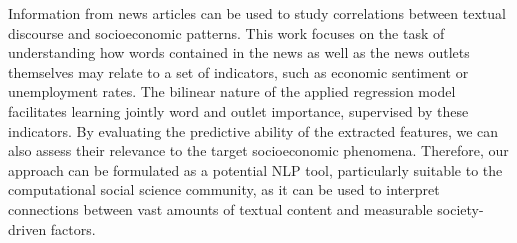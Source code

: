 Information from news articles can be used to study correlations between textual discourse and socioeconomic patterns. This work focuses on the task of understanding how words contained in the news as well as the news outlets themselves may relate to a set of indicators, such as economic sentiment or unemployment rates. The bilinear nature of the applied regression model facilitates learning jointly word and outlet importance, supervised by these indicators. By evaluating the predictive ability of the extracted features, we can also assess their relevance to the target socioeconomic phenomena. Therefore, our approach can be formulated as a potential NLP tool, particularly suitable to the computational social science community, as it can be used to interpret connections between vast amounts of textual content and measurable society-driven factors.
